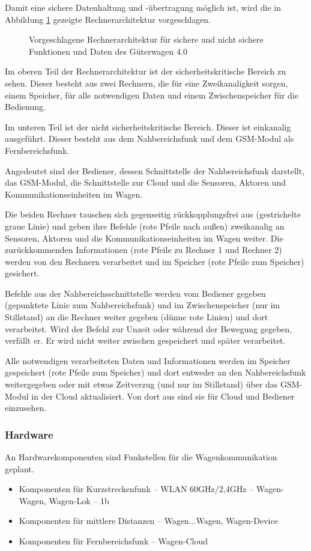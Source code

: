 Damit eine sichere Datenhaltung und -übertragung möglich ist, wird die in Abbildung \ref{fig:Rechnerarchitektur} gezeigte Rechnerarchitektur vorgeschlagen.\par
\begin{figure}[ht]
    \centering
    
    \caption{Vorgeschlagene Rechnerarchitektur für sichere und nicht sichere Funktionen und Daten des Güterwagen 4.0}
    \label{fig:Rechnerarchitektur}
\end{figure}
Im oberen Teil der Rechnerarchitektur ist der sicherheitskritische Bereich zu sehen. %
Dieser besteht aus zwei Rechnern, die für eine Zweikanaligkeit sorgen, einem Speicher,  für alle notwendigen Daten und einem Zwischenspeicher für die Bedienung.\par
Im unteren Teil ist der nicht sicherheitskritische Bereich. Dieser ist einkanalig ausgeführt. Dieser besteht aus dem Nahbereichsfunk und dem GSM-Modul als Fernbereichsfunk.\par
Angedeutet sind der Bediener, dessen Schnittstelle der Nahbereichsfunk darstellt, das GSM-Modul, die Schnittstelle zur Cloud und die Sensoren, Aktoren und Kommunikationseinheiten im Wagen.\par
Die beiden Rechner tauschen sich gegenseitig rückkopplungsfrei aus (gestrichelte graue Linie) und geben ihre Befehle (rote Pfeile nach außen) zweikanalig an Sensoren, Aktoren und die Kommunikationseinheiten im Wagen weiter. Die zurückkommenden Informationen (rote Pfeile zu Rechner 1 und Rechner 2) werden von den Rechnern verarbeitet und im Speicher (rote Pfeile zum Speicher) gesichert.\par
Befehle aus der Nahbereichsschnittstelle werden vom Bediener gegeben (gepunktete Linie zum Nahbereichsfunk) und im Zwischenspeicher (nur im Stillstand) an die Rechner weiter gegeben (dünne rote Linien) und dort verarbeitet. Wird der Befehl zur Unzeit oder während der Bewegung gegeben, verfällt er. Er wird nicht weiter zwischen gespeichert und später verarbeitet.\par
Alle notwendigen verarbeiteten Daten und Informationen werden im Speicher gespeichert (rote Pfeile zum Speicher) und dort entweder an den Nahbereichsfunk weitergegeben oder mit etwas Zeitverzug (und nur im Stillstand) über das GSM-Modul in der Cloud aktualisiert. Von dort aus sind sie für Cloud und Bediener einzusehen.%

\subsubsection{Hardware}
An Hardwarekomponenten sind Funkstellen für die Wagenkommunikation geplant.
\begin{itemize}
    \item Komponenten für Kurzstreckenfunk -- WLAN 60GHz/2,4GHz -- Wagen-Wagen, Wagen-Lok -- 1b
    \item Komponenten für mittlere Distanzen -- Wagen...Wagen, Wagen-Device
    \item Komponenten für Fernbereichsfunk -- Wagen-Cloud
\end{itemize}
